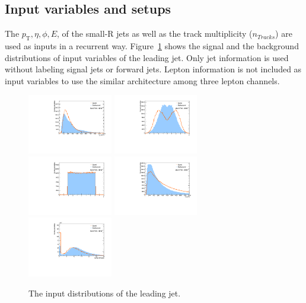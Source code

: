 \subsection{Input variables and setups}
The $p_\mathrm{T}, \eta, \phi, E$, of the small-R jets as well as the track multiplicity ($n_{Tracks}$) are used as inputs in a recurrent way. 
Figure~\ref{fig:RNNinput} shows the signal and the background distributions of input variables of the leading jet. Only jet information is used without labeling signal jets or forward jets.
Lepton information is not included as input variables to use the similar architecture among three lepton channels.
\begin{figure}[htbp]
    \centering
    \includegraphics[width=0.33\textwidth]{figures/RNN/inputs/j1pT.pdf}
    \includegraphics[width=0.33\textwidth]{figures/RNN/inputs/j1eta.pdf}
    \includegraphics[width=0.33\textwidth]{figures/RNN/inputs/j1phi.pdf}
    \includegraphics[width=0.33\textwidth]{figures/RNN/inputs/j1E.pdf}
    \includegraphics[width=0.33\textwidth]{figures/RNN/inputs/j1nTracks.pdf}
    \caption{ The input distributions of the leading jet. 
    }
    \label{fig:RNNinput}
\end{figure}


